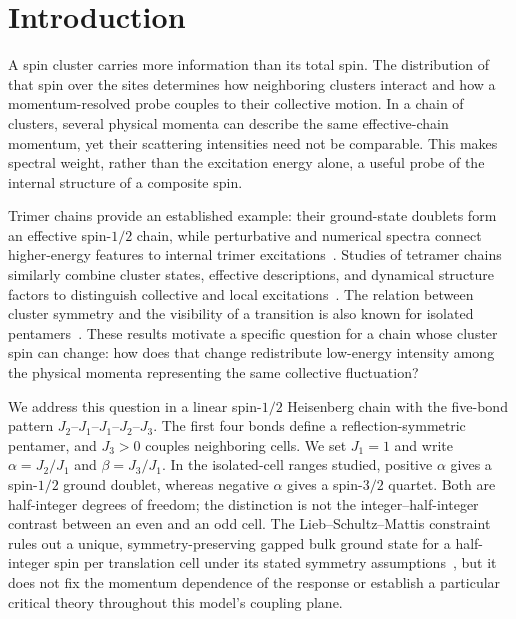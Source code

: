 \section{Introduction}
\label{sec:introduction}

A spin cluster carries more information than its total spin. The distribution
of that spin over the sites determines how neighboring clusters interact and
how a momentum-resolved probe couples to their collective motion. In a chain
of clusters, several physical momenta can describe the same effective-chain
momentum, yet their scattering intensities need not be comparable. This makes
spectral weight, rather than the excitation energy alone, a useful probe of
the internal structure of a composite spin.

Trimer chains provide an established example: their ground-state doublets form
an effective spin-$1/2$ chain, while perturbative and numerical spectra connect
higher-energy features to internal trimer excitations~\cite{cheng2022trimer}.
Studies of tetramer chains similarly combine cluster states, effective
descriptions, and dynamical structure factors to distinguish collective and
local excitations~\cite{li2026tetramer}.
The relation between cluster symmetry and the visibility of a transition is
also known for isolated pentamers~\cite{haraldsen2011pentamer}.
These results motivate a specific question for a chain whose cluster spin can
change: how does that change redistribute low-energy intensity among the
physical momenta representing the same collective fluctuation?

We address this question in a linear spin-$1/2$ Heisenberg chain with the
five-bond pattern $J_2$--$J_1$--$J_1$--$J_2$--$J_3$.
The first four bonds define a reflection-symmetric pentamer, and $J_3>0$
couples neighboring cells. We set $J_1=1$ and write
$\alpha=J_2/J_1$ and $\beta=J_3/J_1$.
In the isolated-cell ranges studied, positive $\alpha$ gives a spin-$1/2$
ground doublet, whereas negative $\alpha$ gives a spin-$3/2$ quartet.
Both are half-integer degrees of freedom; the distinction is not the
integer--half-integer contrast between an even and an odd cell.
The Lieb--Schultz--Mattis constraint rules out a unique, symmetry-preserving
gapped bulk ground state for a half-integer spin per translation cell under
its stated symmetry assumptions~\cite{lieb1961,ogata2019}, but it does not fix
the momentum dependence of the response or establish a particular critical
theory throughout this model's coupling plane.


